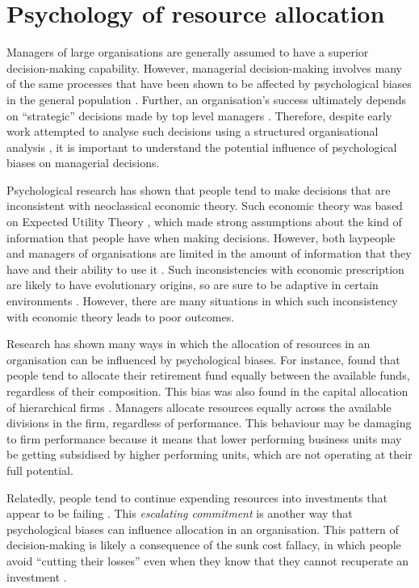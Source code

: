 \documentclass[a4paper, nobind, dvipsnames]{templates/ociamthesis}
\theoremstyle{definition}
\theoremstyle{definition}
\theoremstyle{definition}
\theoremstyle{definition}
\theoremstyle{remark}
\begin{document}
\section{Psychology of resource allocation}

Managers of large organisations are generally assumed to have a superior
decision-making capability. However, managerial decision-making involves many of
the same processes that have been shown to be affected by psychological biases
in the general population \autocite{schwenk1984,das1999,mccray2002}. Further, an
organisation's success ultimately depends on ``strategic'' decisions made by top
level managers \autocite{mazzolini1981}. Therefore, despite early work attempted to
analyse such decisions using a structured organisational analysis \autocite[e.g.,][]{mintzberg1976}, it is important to understand the potential influence of
psychological biases on managerial decisions.

Psychological research has shown that people tend to make decisions that are
inconsistent with neoclassical economic theory. Such economic theory was based
on Expected Utility Theory \autocites[EUT;][]{friedman1948,vonneumann1944}, which made
strong assumptions about the kind of information that people have when making
decisions. However, both laypeople and managers of organisations are limited in
the amount of information that they have and their ability to use it
\autocite{simon1955,cyert1956}. Such inconsistencies with economic prescription are
likely to have evolutionary origins, so are sure to be adaptive in certain
environments \autocite{haselton2009,gigerenzer2008}. However, there are many
situations in which such inconsistency with economic theory leads to poor
outcomes.

Research has shown many ways in which the allocation of resources in an
organisation can be influenced by psychological biases. For instance,
\textcite{benartzi2001} found that people tend to allocate their retirement fund equally
between the available funds, regardless of their composition. This bias was also
found in the capital allocation of hierarchical firms \autocite{bardolet2011}. Managers
allocate resources equally across the available divisions in the firm,
regardless of performance. This behaviour may be damaging to firm performance
because it means that lower performing business units may be getting subsidised
by higher performing units, which are not operating at their full potential.

Relatedly, people tend to continue expending resources into investments that
appear to be failing \autocite{staw1981}. This \emph{escalating commitment} is another way
that psychological biases can influence allocation in an organisation. This
pattern of decision-making is likely a consequence of the sunk cost fallacy, in
which people avoid ``cutting their losses'' even when they know that they cannot
recuperate an investment \autocite{parayre1995}.
\end{document}
